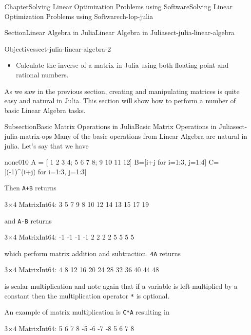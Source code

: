 \documentclass[oneside,10pt,]{book}
\newcommand{\mono}[1]{\texttt{#1}}
\numberwithin{equation}{section}
\begin{document}
\begin{chapterptx}{Chapter}{Solving Linear Optimization Problems using Software}{}{Solving Linear Optimization Problems using Software}{}{}{ch-lop-julia}
\begin{sectionptx}{Section}{Linear Algebra in Julia}{}{Linear Algebra in Julia}{}{}{sect-julia-linear-algebra}
\begin{objectives}{Objectives}{sect-julia-linear-algebra-2}
\begin{itemize}[label=\textbullet]
\item{}Calculate the inverse of a matrix in Julia using both floating-point and rational numbers.%
\end{itemize}
\end{objectives}
\begin{introduction}{}%
As we saw in the previous section, creating and manipulating matrices is quite easy and natural in Julia. This section will show how to perform a number of basic Linear Algebra tasks.%
\end{introduction}%
%
%
\typeout{************************************************}
\typeout{************************************************}
%
\begin{subsectionptx}{Subsection}{Basic Matrix Operations in Julia}{}{Basic Matrix Operations in Julia}{}{}{sect-julia-matrix-ops}
Many of the basic operations from Linear Algebra are natural in julia. Let's say that we have%
\begin{program}{none}{0}{1}{0}
A = [ 1 2 3 4; 5 6 7 8; 9 10 11 12]
B=[i+j for i=1:3, j=1:4]
C=[(-1)^(i+j) for i=1:3, j=1:3]
\end{program}
Then \mono{A+B} returns%
\par
%
\begin{codedisplay}
3×4 Matrix{Int64}:
 3   5   7   9
 8  10  12  14
13  15  17  19
\end{codedisplay}
%
\par
and \mono{A-B} returns%
\par
%
\begin{codedisplay}
3×4 Matrix{Int64}:
-1  -1  -1  -1
 2   2   2   2
 5   5   5   5
\end{codedisplay}
%
\par
which perform matrix addition and subtraction. \mono{4A} returns%
\par
%
\begin{codedisplay}
3×4 Matrix{Int64}:
 4   8  12  16
20  24  28  32
36  40  44  48
\end{codedisplay}
%
\par
is scalar multiplication and note again that if a variable is left-multiplied by a constant then the multiplication operator \mono{*} is optional.%
\par
An example of matrix multiplication is \mono{C*A} resulting in%
\par
%
\begin{codedisplay}
3×4 Matrix{Int64}:
 5   6   7   8
-5  -6  -7  -8
 5   6   7   8
\end{codedisplay}

\end{subsectionptx}
\end{sectionptx}
\end{chapterptx}
\end{document}
